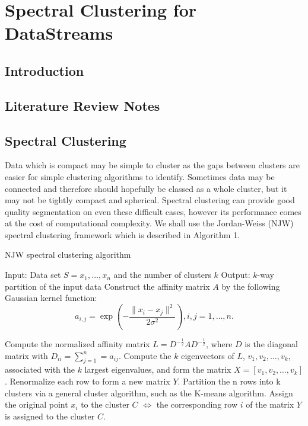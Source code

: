 \documentclass[a4document]{article}		%
\begin{document}

\chapter{Spectral Clustering for DataStreams}

\section{Introduction}

\section{Literature Review Notes}
\label{sec:lit-Clust}





\section{Spectral Clustering}
\label{sec:spec}
Data which is compact may be simple to cluster as the gaps between clusters are easier for simple clustering algorithms to identify. Sometimes data may be connected and therefore should hopefully be classed as a whole cluster, but it may not be tightly compact and spherical. Spectral clustering can provide good quality segmentation on even these difficult cases, however its performance comes at the cost of computational complexity. We shall use the Jordan-Weiss (NJW) spectral clustering framework which is described in Algorithm 1. 

\begin{algorithm}
\caption{NJW spectral clustering algorithm}
\begin{algorithmic}
\STATE Input: Data set $S = {x_1,\ldots, x_n  }$ and the number of clusters $k$
\STATE Output: $k$-way partition of the input data
\STATE Construct the affinity matrix $A$ by the following Gaussian kernel function:
\begin{equation}
  a_{i,j} = \exp  \left( - \frac{\| x_i - x_j \|^2}{2 \sigma^2} \right), i,j = 1, \ldots,n.
\end{equation}

\STATE Compute the normalized affinity matrix $L = D^{-\frac{1}{2}}A D^{-\frac{1}{2}}$, where $D$ is the diagonal matrix with $D_{ii}=\sum_{j=1}^{n}=a_{ij}.$
\STATE Compute the $k$ eigenvectors of $L$, $v_1, v_2,\ldots , v_k,$ associated with the $k$ largest eigenvalues, and form the matrix $ X = [v_1,v_2, \ldots , v_k]$.
\STATE Renormalize each row to form a new matrix $Y$.
\STATE Partition the n rows into k clusters via a general cluster algorithm, such as the K-means algorithm.
\STATE Assign the original point $x_i$ to the cluster $C$ $\iff$ the corresponding row $i$ of the matrix $Y$ is assigned to the cluster $C$.

\end{algorithmic}
\end{algorithm}
\end{document}
